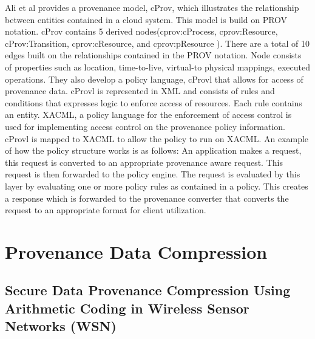 Ali et al \cite{Ali:2013:PPL:2569433.2569893} provides a provenance model, cProv, which illustrates the relationship between entities contained in a cloud system. This model is build on PROV notation. cProv contains 5 derived nodes(cprov:cProcess, cprov:Resource, cProv:Transition, cprov:cResource, and cprov:pResource ). There are a total of 10 edges built on the relationships contained in the PROV notation. Node consists of properties such as location, time-to-live, virtual-to physical mappings, executed operations. They also develop a policy language, cProvl that allows for access of provenance data. cProvl is represented in XML and consists of rules  and conditions that expresses logic to enforce access of resources. Each rule contains an entity. XACML, a policy language for the enforcement of access control is used for implementing access control on the provenance policy information. cProvl is mapped to XACML to allow the policy to run on XACML. An example of how the policy structure works is as follows: An application makes a request, this request is converted to an appropriate provenance aware request. This request is then forwarded to the policy engine. The request is evaluated by this layer by evaluating one or more policy rules as contained in a policy. This creates a response which is forwarded to the provenance converter that converts the request to an appropriate format for client utilization.



\section{Provenance Data Compression}

\subsection{Secure Data Provenance Compression Using Arithmetic Coding in Wireless Sensor Networks (WSN)}

